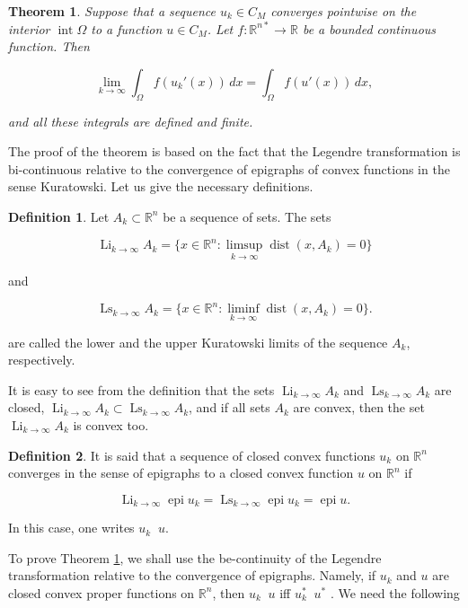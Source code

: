 \documentclass[14pt]{extarticle}
\newcommand{\R}{\mathbb{R}}
\DeclareMathOperator{\epi}{\mathrm{epi}}
\DeclareMathOperator{\Int}{\mathrm{int}}
\DeclareMathOperator{\dist}{\mathrm{dist}}
\DeclareMathOperator{\toe}{\stackrel{e}{\to}}
\DeclareMathOperator*{\Li}{\mathrm{Li}}
\DeclareMathOperator*{\Ls}{\mathrm{Ls}}
\newtheorem{thm}{Theorem}
\theoremstyle{remark}
\theoremstyle{definition}
\newtheorem{defn}{Definition}
\begin{document}
\begin{thm}
\label{thm:pointwise_limit}
	Suppose that a sequence $u_k\in C_M$ converges pointwise on the interior $\Int\Omega$ to a function $u\in C_M$. Let $f:\R^{n*}\to\R$ be a bounded continuous function. Then

	\[
		\lim_{k\to\infty}\int_{\Omega}f(u_k'(x))\,dx =
		\int_{\Omega}f(u'(x))\,dx,
	\]

	\noindent and all these integrals are defined and finite.
	
\end{thm}

The proof of the theorem is based on the fact that the Legendre transformation is bi-continuous relative to the convergence of epigraphs of convex functions in the sense Kuratowski. Let us give the necessary definitions.


\begin{defn}
	Let $A_k\subset \R^n$  be a sequence of sets. The sets
	
	
	\[
		\Li_{k\to\infty} A_k = \{x\in\R^n:\limsup_{k\to\infty}\dist(x,A_k)=0\}
	\]

	\noindent and
	
	\[
		\Ls_{k\to\infty} A_k = \{x\in\R^n:\liminf_{k\to\infty}\dist(x,A_k)=0\}.
	\]
	
	\noindent are called the lower and the upper Kuratowski limits of the sequence $A_k$, respectively.
\end{defn}

It is easy to see from the definition that the sets $\Li_{k\to\infty} A_k$ and $\Ls_{k\to\infty} A_k$ are closed, $\Li_{k\to\infty} A_k\subset \Ls_{k\to\infty} A_k$, and if all sets $A_k$ are convex, then the set $\Li_{k\to\infty} A_k$ is convex too.

\begin{defn}
	It is said that a sequence of closed convex functions $u_k$ on $\R^n$ converges in the sense of epigraphs to a closed convex function $u$ on $\R^n$ if

	\[
		\Li_{k\to\infty} \epi u_k = \Ls_{k\to\infty} \epi u_k = \epi u.
	\]

	\noindent In this case, one writes  $u_k\toe u$.
\end{defn}

To prove Theorem \ref{thm:pointwise_limit}, we shall use the be-continuity of the Legendre transformation relative to the convergence of epigraphs. Namely, if $u_k$ and $u$ are closed convex proper functions on $\R^n$, then $u_k\toe u$ iff $u^*_k\toe u^*$ \cite{Mosco,Joly}. We need the following
\end{document}
